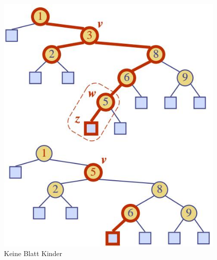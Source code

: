 \begin{description}
\begin{itemize}
\begin{figure}[ht!]
\begin{minipage}[t]{0.4\textwidth}
			\end{minipage}
			\begin{minipage}[t]{0.4\textwidth}
				\centering
				\includegraphics[width=0.9\linewidth]{images/search_tree_delete_3}
				\caption{Keine Blatt Kinder}
				\label{fig:searchtreeinsert1}
			\end{minipage}
		\end{figure}
	\end{itemize}
\end{description}
\clearpage

